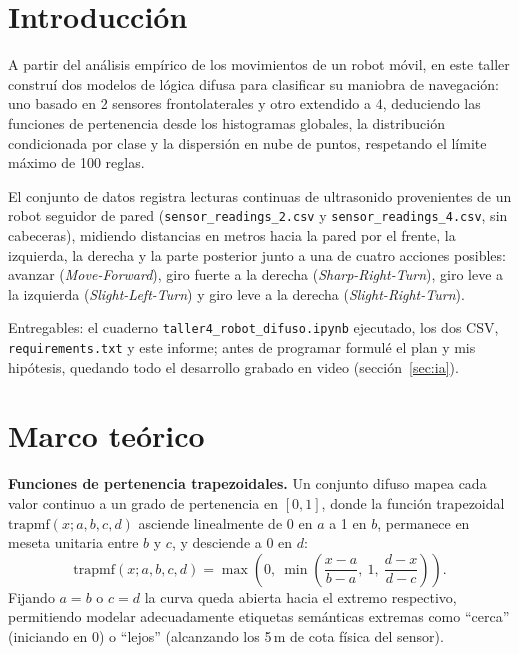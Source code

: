 \documentclass[11pt,letterpaper]{article}
\begin{document}
\UDportada

\section{Introducción}

A partir del análisis empírico de los movimientos de un robot móvil, en este taller construí dos modelos de lógica difusa para clasificar su maniobra de navegación: uno basado en 2 sensores frontolaterales y otro extendido a 4, deduciendo las funciones de pertenencia desde los histogramas globales, la distribución condicionada por clase y la dispersión en nube de puntos, respetando el límite máximo de 100 reglas.

El conjunto de datos registra lecturas continuas de ultrasonido provenientes de un robot seguidor de pared (\texttt{sensor\_readings\_2.csv} y \texttt{sensor\_readings\_4.csv}, sin cabeceras), midiendo distancias en metros hacia la pared por el frente, la izquierda, la derecha y la parte posterior junto a una de cuatro acciones posibles: avanzar (\textit{Move-Forward}), giro fuerte a la derecha (\textit{Sharp-Right-Turn}), giro leve a la izquierda (\textit{Slight-Left-Turn}) y giro leve a la derecha (\textit{Slight-Right-Turn}).

Entregables: el cuaderno \texttt{taller4\_robot\_difuso.ipynb} ejecutado, los dos CSV, \texttt{requirements.txt} y este informe; antes de programar formulé el plan y mis hipótesis, quedando todo el desarrollo grabado en video (sección~\ref{sec:ia}).

\section{Marco teórico}

\textbf{Funciones de pertenencia trapezoidales.} Un conjunto difuso mapea cada valor continuo a un grado de pertenencia en $[0,1]$, donde la función trapezoidal $\mathrm{trapmf}(x;a,b,c,d)$ asciende linealmente de 0 en $a$ a 1 en $b$, permanece en meseta unitaria entre $b$ y $c$, y desciende a 0 en $d$:
\begin{equation*}
\mathrm{trapmf}(x;a,b,c,d)=\max\!\left(0,\ \min\!\left(\frac{x-a}{b-a},\ 1,\ \frac{d-x}{d-c}\right)\right).
\end{equation*}
Fijando $a=b$ o $c=d$ la curva queda abierta hacia el extremo respectivo, permitiendo modelar adecuadamente etiquetas semánticas extremas como ``cerca'' (iniciando en 0) o ``lejos'' (alcanzando los 5\,m de cota física del sensor).
\end{document}
